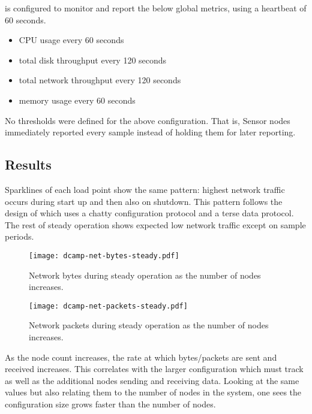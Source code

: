 \dcamp is configured to monitor and report the below global metrics, using a heartbeat of 60 seconds.

\begin{itemize}
\item CPU usage every 60 seconds
\item total disk throughput every 120 seconds
\item total network throughput every 120 seconds
\item memory usage every 60 seconds
\end{itemize}

No thresholds were defined for the above configuration. That is, Sensor nodes immediately reported every sample instead
of holding them for later reporting.

\subsection{Results}

Sparklines of each load point show the same pattern: highest network traffic occurs during start up and then also on
shutdown. This pattern follows the design of \dcamp which uses a chatty configuration protocol and a terse data
protocol. The rest of steady operation shows expected low network traffic except on sample periods.

\begin{figure}[H]
    \centering
    \vspace{-20pt}
    \texttt{[image: dcamp-net-bytes-steady.pdf]}
    \vspace{-40pt}
    \caption{Network bytes during steady operation as the number of \dcamp nodes increases.}
    \label{fig:net_bytes_steady_graph}
\end{figure}

\begin{figure}[H]
    \centering
    \vspace{-20pt}
    \texttt{[image: dcamp-net-packets-steady.pdf]}
    \vspace{-40pt}
    \caption{Network packets during steady operation as the number of \dcamp nodes increases.}
    \label{fig:net_packets_steady_graph}
\end{figure}

As the node count increases, the rate at which bytes/packets are sent and received increases. This correlates with the
larger configuration which \dcamp must track as well as the additional nodes sending and receiving data. Looking at the
same values but also relating them to the number of nodes in the system, one sees the configuration size grows faster
than the number of nodes.

